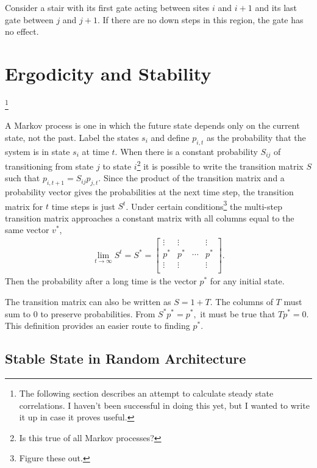 \documentclass[11pt]{article}
\begin{document}
Consider a stair with its first gate acting between sites $i$ and $i+1$ and its last gate between $j$ and $j+1$. If there are no down steps in this region, the gate has no effect. 

\section{Ergodicity and Stability}\footnote{The following section describes an attempt to calculate steady state correlations. I haven't been successful in doing this yet, but I wanted to write it up in case it proves useful.} \label{sec:erg}

A Markov process is one in which the future state depends only on the current state, not the past. Label the states $s_i$ and define $p_{i,t}$ as the probability that the system is in state $s_i$ at time $t$. When there is a constant probability $S_{ij}$ of transitioning from state $j$ to state $i$\footnote{Is this true of all Markov processes?} it is possible to write the transition matrix $S$ such that $p_{i,t+1}= S_{ij}p_{j,t}$. Since the product of the transition matrix and a probability vector gives the probabilities at the next time step, the transition matrix for $t$ time steps is just $S^t$. Under certain conditions\footnote{Figure these out.} the multi-step transition matrix approaches a constant matrix with all columns equal to the same vector $v^*$,
\begin{align}
\lim\limits_{t\to \infty}S^t = S^* = \begin{bmatrix}
\vdots & \vdots &  & \vdots\\
p^* & p^* & \cdots & p^*\\
\vdots & \vdots &  & \vdots\\
\end{bmatrix}.
\end{align}
Then the probability after a long time is the vector $p^*$ for any initial state.

The transition matrix can also be written as $S = 1+T$. The columns of $T$ must sum to 0 to preserve probabilities. From $S^*p^* = p^*,$ it must be true that $Tp^*=0$. This definition provides an easier route to finding $p^*$.

\subsection{Stable State in Random Architecture} \emph{} \label{sub:randstate}
\end{document}
